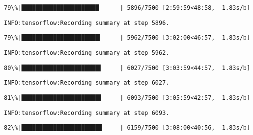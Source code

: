 \documentclass[11pt]{article}
\begin{document}
    \begin{Verbatim}[commandchars=\\\{\}]
 79\%|██████████████████████      | 5896/7500 [2:59:59<48:58,  1.83s/b]
    \end{Verbatim}

    \begin{Verbatim}[commandchars=\\\{\}]
INFO:tensorflow:Recording summary at step 5896.

    \end{Verbatim}

    \begin{Verbatim}[commandchars=\\\{\}]
 79\%|██████████████████████▎     | 5962/7500 [3:02:00<46:57,  1.83s/b]
    \end{Verbatim}

    \begin{Verbatim}[commandchars=\\\{\}]
INFO:tensorflow:Recording summary at step 5962.

    \end{Verbatim}

    \begin{Verbatim}[commandchars=\\\{\}]
 80\%|██████████████████████▌     | 6027/7500 [3:03:59<44:57,  1.83s/b]
    \end{Verbatim}

    \begin{Verbatim}[commandchars=\\\{\}]
INFO:tensorflow:Recording summary at step 6027.

    \end{Verbatim}

    \begin{Verbatim}[commandchars=\\\{\}]
 81\%|██████████████████████▋     | 6093/7500 [3:05:59<42:57,  1.83s/b]
    \end{Verbatim}

    \begin{Verbatim}[commandchars=\\\{\}]
INFO:tensorflow:Recording summary at step 6093.

    \end{Verbatim}

    \begin{Verbatim}[commandchars=\\\{\}]
 82\%|██████████████████████▉     | 6159/7500 [3:08:00<40:56,  1.83s/b]
    \end{Verbatim}
\end{document}
